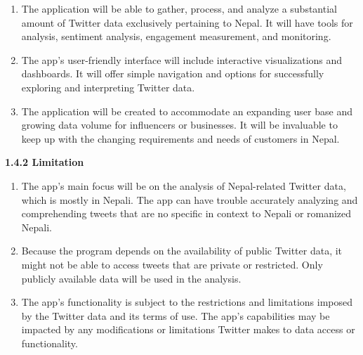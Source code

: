 \documentclass[a4paper,12pt]{article}
\begin{document}
{{{		\begin{enumerate}
												   
			\item  The application will be able to gather, process, and analyze a substantial amount of Twitter data exclusively pertaining to Nepal. It will have tools for analysis, sentiment analysis, engagement measurement, and monitoring.
			      			      			      			      
			\item  The app's user-friendly interface will include interactive visualizations and dashboards. It will offer simple navigation and options for successfully exploring and interpreting Twitter data.
			      			      			      			      
			\item  The application will be created to accommodate an expanding user base and growing data volume for influencers or businesses. It will be invaluable to keep up with the changing requirements and needs of customers in Nepal.
		\end{enumerate}
								
								
		\vspace{1cm}
		\begin{flushleft}
			\fontsize{13}{15}\selectfont\textbf{1.4.2 Limitation}
			\label{limitation}
		\end{flushleft}
								
		\begin{enumerate}
												    
												
			\item  The app's main focus will be on the analysis of Nepal-related Twitter data, which is mostly in Nepali. The app can have trouble accurately analyzing and comprehending tweets that are no specific in context to Nepali or romanized Nepali.
			      			      			      			      
			\item  Because the program depends on the availability of public Twitter data, it might not be able to access tweets that are private or restricted. Only publicly available data will be used in the analysis.
			      			      			      			      
			\item  The app's functionality is subject to the restrictions and limitations imposed by the Twitter data and its terms of use. The app's capabilities may be impacted by any modifications or limitations Twitter makes to data access or functionality.
			      			      			      			      

\end{enumerate}}}}
\end{document}
